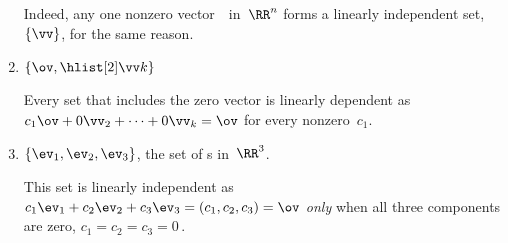 \begin{example}
\begin{enumerate}[ref=\ref{eg:lindep}(\alph*)]
\begin{solution}
Indeed, any one nonzero vector~\vv\ in~\(\RR^n\) forms a linearly independent set,~\(\{\vv\}\), for the same reason.
\end{solution}



\item \(\{\ov,\hlist[2]\vv k\}\)
\begin{solution} 
Every  set that includes the zero vector is linearly dependent as
\(c_1\ov+0\vv_2+\cdots+0\vv_k=\ov\) for every nonzero~\(c_1\).
\end{solution}

\item {}\(\{\ev_1,\ev_2,\ev_3\}\), the set of s in~\(\RR^3\).
\begin{solution} 
This set is linearly independent as
\(c_1\ev_1+c_2\ev_2+c_3\ev_3=(c_1,c_2,c_3)=\ov\)
\emph{only} when all three components are zero, \(c_1=c_2=c_3=0\)\,. 
\end{solution}


\end{enumerate}
\end{example}
